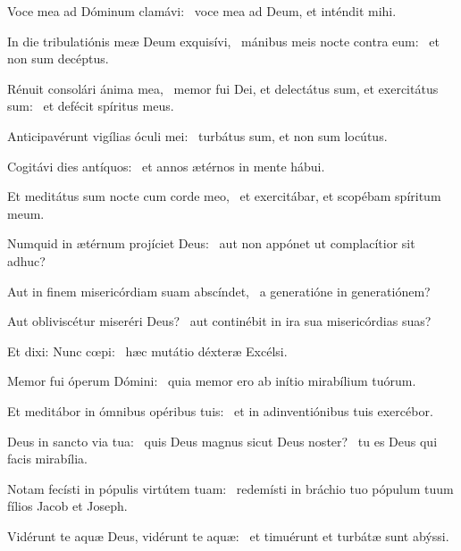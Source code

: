 \item Voce mea ad Dóminum clamávi:~\psstar{} voce mea ad Deum, et inténdit mihi.

\item In die tribulatiónis meæ Deum exquisívi,~\pscross{} mánibus meis nocte contra eum:~\psstar{} et non sum decéptus.

\item Rénuit consolári ánima mea,~\pscross{} memor fui Dei, et delectátus sum, et exercitátus sum:~\psstar{} et defécit spíritus meus.

\item Anticipavérunt vigílias óculi mei:~\psstar{} turbátus sum, et non sum locútus.

\item Cogitávi dies antíquos:~\psstar{} et annos ætérnos in mente hábui.

\item Et meditátus sum nocte cum corde meo,~\psstar{} et exercitábar, et scopébam spíritum meum.

\item Numquid in ætérnum projíciet Deus:~\psstar{} aut non appónet ut complacítior sit adhuc?

\item Aut in finem misericórdiam suam abscíndet,~\psstar{} a generatióne in generatiónem?

\item Aut obliviscétur miseréri Deus?~\psstar{} aut continébit in ira sua misericórdias suas?

\item Et dixi: Nunc cœpi:~\psstar{} hæc mutátio déxteræ Excélsi.

\item Memor fui óperum Dómini:~\psstar{} quia memor ero ab inítio mirabílium tuórum.

\item Et meditábor in ómnibus opéribus tuis:~\psstar{} et in adinventiónibus tuis exercébor.

\item Deus in sancto via tua:~\pscross{} quis Deus magnus sicut Deus noster?~\psstar{} tu es Deus qui facis mirabília.

\item Notam fecísti in pópulis virtútem tuam:~\psstar{} redemísti in bráchio tuo pópulum tuum fílios Jacob et Joseph.

\item Vidérunt te aquæ Deus, vidérunt te aquæ:~\psstar{} et timuérunt et turbátæ sunt abýssi.

